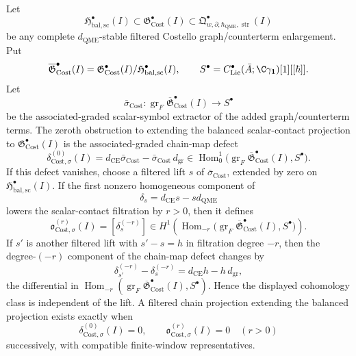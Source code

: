 \begin{thm}
\label{thm:app-costello-graph-extension-obstruction}
  Let
  \[
    \mathfrak H^\bullet_{\mathrm{bal,sc}}(I)
      \subset
    \mathfrak G^\bullet_{\mathrm{Cost}}(I)
      \subset
    \mathfrak Q^\bullet_{w,\partial,\hbar_{\mathrm{QME}},\operatorname{str}}(I)
  \]
  be any complete \(d_{\mathrm{QME}}\)-stable filtered
  Costello graph/counterterm enlargement.  Put
  \[
    \overline{\mathfrak G}^\bullet_{\mathrm{Cost}}(I)
      =
    \mathfrak G^\bullet_{\mathrm{Cost}}(I)/
    \mathfrak H^\bullet_{\mathrm{bal,sc}}(I),
    \qquad
    S^\bullet=
    C^\bullet_{\mathrm{Lie}}(\bar A;\C\gamma_{\mathbf 1})[1][[\hbar]].
  \]
  Let
  \[
    \bar\sigma_{\mathrm{Cost}}\colon
    \operatorname{gr}_{F}
      \overline{\mathfrak G}^\bullet_{\mathrm{Cost}}(I)
      \longrightarrow S^\bullet
  \]
  be the associated-graded scalar-symbol extractor of the added
  graph/counterterm terms.  The zeroth obstruction to extending the
  balanced scalar-contact projection to
  \(\mathfrak G^\bullet_{\mathrm{Cost}}(I)\) is the
  associated-graded chain-map defect
  \[
    \delta^{(0)}_{\mathrm{Cost},\sigma}(I)
      =
      d_{\mathrm{CE}}\bar\sigma_{\mathrm{Cost}}
        -
      \bar\sigma_{\mathrm{Cost}}\,d_{\operatorname{gr}}
    \in
    \operatorname{Hom}^{1}_{0}\bigl(
        \operatorname{gr}_{F}
          \overline{\mathfrak G}^\bullet_{\mathrm{Cost}}(I),
        S^\bullet
      \bigr) .
  \]
  If this defect vanishes, choose a filtered lift \(s\) of
  \(\bar\sigma_{\mathrm{Cost}}\), extended by zero on
  \(\mathfrak H^\bullet_{\mathrm{bal,sc}}(I)\).  If the first nonzero
  homogeneous component of
  \[
    \delta_s=d_{\mathrm{CE}}s-sd_{\mathrm{QME}}
  \]
  lowers the scalar-contact filtration by \(r>0\), then it defines
  \[
    \mathfrak o^{(r)}_{\mathrm{Cost},\sigma}(I)
      =
    \left[\delta_s^{(-r)}\right]
    \in
    H^1\!\left(
      \operatorname{Hom}_{-r}\bigl(
        \operatorname{gr}_{F}
          \overline{\mathfrak G}^\bullet_{\mathrm{Cost}}(I),
        S^\bullet
      \bigr)
    \right).
  \]
  If \(s'\) is another filtered lift with
  \(s'-s=h\) in filtration degree \(-r\), then the degree-\((-r)\)
  component of the chain-map defect changes by
  \[
    \delta_{s'}^{(-r)}-\delta_s^{(-r)}
    =
    d_{\mathrm{CE}}h-h\,d_{\operatorname{gr}},
  \]
  the differential in
  \(\operatorname{Hom}_{-r}(
  \operatorname{gr}_{F}\overline{\mathfrak G}^\bullet_{\mathrm{Cost}}(I),
  S^\bullet)\).  Hence the displayed cohomology class is independent
  of the lift.  A filtered chain projection extending the balanced
  projection exists exactly when
  \[
    \delta^{(0)}_{\mathrm{Cost},\sigma}(I)=0,\qquad
    \mathfrak o^{(r)}_{\mathrm{Cost},\sigma}(I)=0
    \quad(r>0)
  \]
  successively, with compatible finite-window representatives.


\end{thm}
